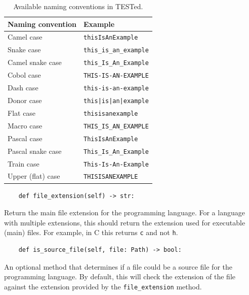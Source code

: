\documentclass[../main]{subfiles}
\begin{document}
\begin{table}[h]
    \centering
    \caption{Available naming conventions in TESTed.}
    \label{tab:naming-conventions}
    \begin{tabular}{|l|l|}
        \hline
        Naming convention & Example \\
        \hline
        Camel case & \texttt{thisIsAnExample}  \\
        Snake case & \texttt{this\_is\_an\_example} \\
        Camel snake case & \texttt{this\_Is\_An\_Example} \\
        Cobol case & \texttt{THIS-IS-AN-EXAMPLE} \\
        Dash case & \texttt{this-is-an-example} \\
        Donor case & \texttt{this|is|an|example} \\
        Flat case & \texttt{thisisanexample} \\
        Macro case & \texttt{THIS\_IS\_AN\_EXAMPLE} \\
        Pascal case & \texttt{ThisIsAnExample} \\
        Pascal snake case & \texttt{This\_Is\_An\_Example} \\
        Train case & \texttt{This-Is-An-Example} \\
        Upper (flat) case & \texttt{THISISANEXAMPLE} \\
        \hline
    \end{tabular}
\end{table}

\begin{verbatim}
    def file_extension(self) -> str:
\end{verbatim}

Return the main file extension for the programming language.
For a language with multiple extensions, this should return the extension used for executable (main) files.
For example, in C this returns \texttt{c} and not \texttt{h}.

\begin{verbatim}
    def is_source_file(self, file: Path) -> bool:
\end{verbatim}

An optional method that determines if a file could be a source file for the programming language.
By default, this will check the extension of the file against the extension provided by the \texttt{file_extension} method.
\end{document}
